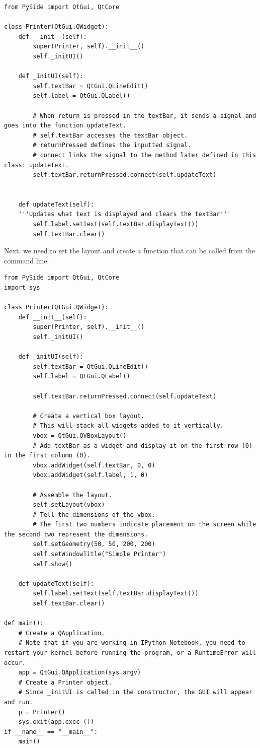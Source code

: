 \begin{lstlisting}
from PySide import QtGui, QtCore

class Printer(QtGui.QWidget):
	def __init__(self):
		super(Printer, self).__init__()
		self._initUI()

	def _initUI(self):
		self.textBar = QtGui.QLineEdit()
		self.label = QtGui.QLabel()
		
		# When return is pressed in the textBar, it sends a signal and goes into the function updateText.
        # self.textBar accesses the textBar object.
        # returnPressed defines the inputted signal.
        # connect links the signal to the method later defined in this class: updateText.
		self.textBar.returnPressed.connect(self.updateText)
	
		
	def updateText(self):
	'''Updates what text is displayed and clears the textBar'''
		self.label.setText(self.textBar.displayText())
		self.textBar.clear()

\end{lstlisting}

Next, we need to set the layout and create a function that can be called from the command line.

\begin{lstlisting}
from PySide import QtGui, QtCore
import sys

class Printer(QtGui.QWidget):
	def __init__(self):
		super(Printer, self).__init__()
		self._initUI()

	def _initUI(self):
		self.textBar = QtGui.QLineEdit()
		self.label = QtGui.QLabel()
		
		self.textBar.returnPressed.connect(self.updateText)
	
		# Create a vertical box layout.
		# This will stack all widgets added to it vertically.
		vbox = QtGui.QVBoxLayout()
		# Add textBar as a widget and display it on the first row (0) in the first column (0).
        vbox.addWidget(self.textBar, 0, 0)
		vbox.addWidget(self.label, 1, 0)
		
		# Assemble the layout.
		self.setLayout(vbox)
		# Tell the dimensions of the vbox.
		# The first two numbers indicate placement on the screen while the second two represent the dimensions.
		self.setGeometry(50, 50, 200, 200)
		self.setWindowTitle("Simple Printer")
		self.show()
	
	def updateText(self):
		self.label.setText(self.textBar.displayText())
		self.textBar.clear()
		
def main():
	# Create a QApplication.
    # Note that if you are working in IPython Notebook, you need to restart your kernel before running the program, or a RuntimeError will occur.
	app = QtGui.QApplication(sys.argv)
	# Create a Printer object.
    # Since _initUI is called in the constructor, the GUI will appear and run.
	p = Printer()
	sys.exit(app.exec_())
if __name__ == "__main__":
	main()

\end{lstlisting}


